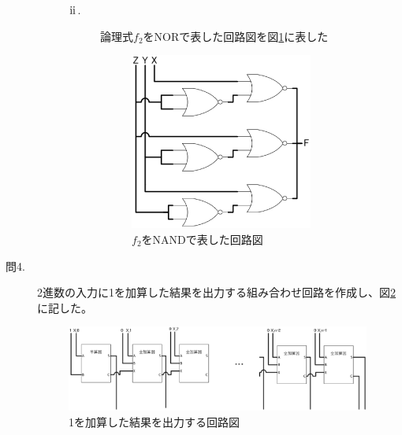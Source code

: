 \documentclass{jsarticle}
\begin{document}
\begin{description}
\begin{description}
\begin{description}
              \item [$\rm \hspace{.08em}ii\hspace{.08em}$.]
              論理式$f_2$をNORで表した回路図を図\ref{fig:3d_2}に表した
              \begin{figure}[H]
                  \centering
                  \includegraphics[width=6cm]{logic_3d_2.eps}
                  \caption{$f_2$をNANDで表した回路図}
                  \label{fig:3d_2}
              \end{figure}

          \end{description}
      \end{description}
      \item [問4.]
      2進数の入力に1を加算した結果を出力する組み合わせ回路を作成し、図\ref{fig:4}に記した。
      \begin{figure}[H]
          \centering
          \includegraphics[width=10cm]{logic_4.eps}
          \caption{1を加算した結果を出力する回路図}
          \label{fig:4}
      \end{figure}
  \end{description}
\end{document}
